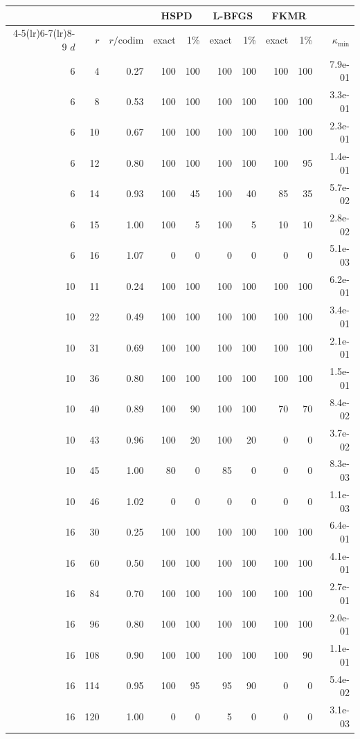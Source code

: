 \begin{tabular}{r r r rr rr rr r}
\toprule
& & & \multicolumn{2}{c}{HSPD} & \multicolumn{2}{c}{L-BFGS} & \multicolumn{2}{c}{FKMR} & \\
\cmidrule(lr){4-5}\cmidrule(lr){6-7}\cmidrule(lr){8-9}
$d$ & $r$ & $r/\mathrm{codim}$ & exact & 1\% & exact & 1\% & exact & 1\% & $\kappa_{\min}$\\
\midrule
6 & 4 & 0.27 & 100 & 100 & 100 & 100 & 100 & 100 & 7.9e-01 \\
6 & 8 & 0.53 & 100 & 100 & 100 & 100 & 100 & 100 & 3.3e-01 \\
6 & 10 & 0.67 & 100 & 100 & 100 & 100 & 100 & 100 & 2.3e-01 \\
6 & 12 & 0.80 & 100 & 100 & 100 & 100 & 100 & 95 & 1.4e-01 \\
6 & 14 & 0.93 & 100 & 45 & 100 & 40 & 85 & 35 & 5.7e-02 \\
6 & 15 & 1.00 & 100 & 5 & 100 & 5 & 10 & 10 & 2.8e-02 \\
6 & 16 & 1.07 & 0 & 0 & 0 & 0 & 0 & 0 & 5.1e-03 \\
\midrule
10 & 11 & 0.24 & 100 & 100 & 100 & 100 & 100 & 100 & 6.2e-01 \\
10 & 22 & 0.49 & 100 & 100 & 100 & 100 & 100 & 100 & 3.4e-01 \\
10 & 31 & 0.69 & 100 & 100 & 100 & 100 & 100 & 100 & 2.1e-01 \\
10 & 36 & 0.80 & 100 & 100 & 100 & 100 & 100 & 100 & 1.5e-01 \\
10 & 40 & 0.89 & 100 & 90 & 100 & 100 & 70 & 70 & 8.4e-02 \\
10 & 43 & 0.96 & 100 & 20 & 100 & 20 & 0 & 0 & 3.7e-02 \\
10 & 45 & 1.00 & 80 & 0 & 85 & 0 & 0 & 0 & 8.3e-03 \\
10 & 46 & 1.02 & 0 & 0 & 0 & 0 & 0 & 0 & 1.1e-03 \\
\midrule
16 & 30 & 0.25 & 100 & 100 & 100 & 100 & 100 & 100 & 6.4e-01 \\
16 & 60 & 0.50 & 100 & 100 & 100 & 100 & 100 & 100 & 4.1e-01 \\
16 & 84 & 0.70 & 100 & 100 & 100 & 100 & 100 & 100 & 2.7e-01 \\
16 & 96 & 0.80 & 100 & 100 & 100 & 100 & 100 & 100 & 2.0e-01 \\
16 & 108 & 0.90 & 100 & 100 & 100 & 100 & 100 & 90 & 1.1e-01 \\
16 & 114 & 0.95 & 100 & 95 & 95 & 90 & 0 & 0 & 5.4e-02 \\
16 & 120 & 1.00 & 0 & 0 & 5 & 0 & 0 & 0 & 3.1e-03 \\

\end{tabular}
